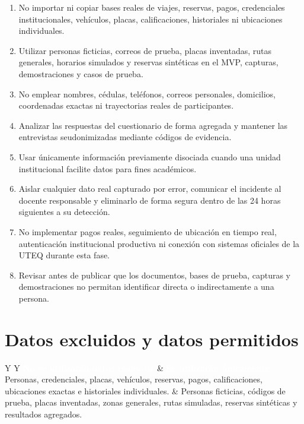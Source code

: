 \documentclass[10pt,a4paper]{article}
\begin{document}
\begin{enumerate}
  \item No importar ni copiar bases reales de viajes, reservas, pagos, credenciales institucionales, vehículos, placas, calificaciones, historiales ni ubicaciones individuales.
  \item Utilizar personas ficticias, correos de prueba, placas inventadas, rutas generales, horarios simulados y reservas sintéticas en el MVP, capturas, demostraciones y casos de prueba.
  \item No emplear nombres, cédulas, teléfonos, correos personales, domicilios, coordenadas exactas ni trayectorias reales de participantes.
  \item Analizar las respuestas del cuestionario de forma agregada y mantener las entrevistas seudonimizadas mediante códigos de evidencia.
  \item Usar únicamente información previamente disociada cuando una unidad institucional facilite datos para fines académicos.
  \item Aislar cualquier dato real capturado por error, comunicar el incidente al docente responsable y eliminarlo de forma segura dentro de las 24 horas siguientes a su detección.
  \item No implementar pagos reales, seguimiento de ubicación en tiempo real, autenticación institucional productiva ni conexión con sistemas oficiales de la UTEQ durante esta fase.
  \item Revisar antes de publicar que los documentos, bases de prueba, capturas y demostraciones no permitan identificar directa o indirectamente a una persona.
\end{enumerate}

\section{Datos excluidos y datos permitidos}

\noindent\begin{tabularx}{\textwidth}{Y Y}
\textcolor{white}{\textbf{No se utilizarán datos reales de}} &
\textcolor{white}{\textbf{Se utilizarán únicamente}}\\
Personas, credenciales, placas, vehículos, reservas, pagos, calificaciones, ubicaciones exactas e historiales individuales. &
Personas ficticias, códigos de prueba, placas inventadas, zonas generales, rutas simuladas, reservas sintéticas y resultados agregados.\\
\end{tabularx}
\end{document}
